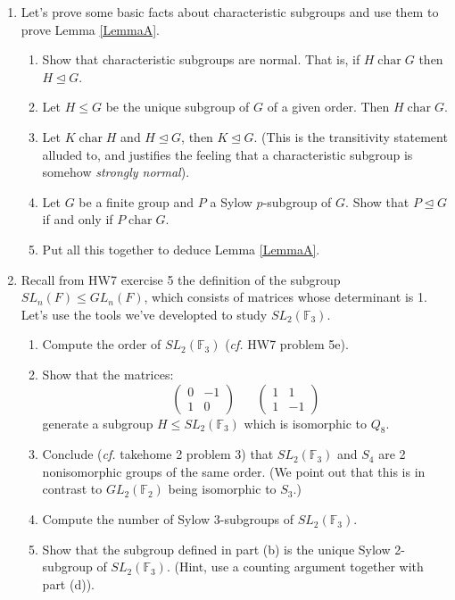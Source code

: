 \documentclass[11pt]{article}
\newcommand{\ch}{\operatorname{char}}
\newcommand{\bF}{\mathbb{F}}
\begin{document}
\begin{enumerate}
  \item{
  Let's prove some basic facts about characteristic subgroups and use them to prove Lemma \ref{LemmaA}.
  \begin{enumerate}
    \item{
    Show that characteristic subgroups are normal.  That is, if $H\ch G$ then $H\unlhd G$.
    }
    \item{
    Let $H\le G$ be the unique subgroup of $G$ of a given order.  Then $H\ch G$.
    }
    \item{
    Let $K\ch H$ and $H\unlhd G$, then $K\unlhd G$.  (This is the transitivity statement alluded to, and justifies the feeling that a characteristic subgroup is somehow \textit{strongly normal}).
    }
    \item{
    Let $G$ be a finite group and $P$ a Sylow $p$-subgroup of $G$.  Show that $P\unlhd G$ if and only if $P\ch G$.
    }
    \item{
    Put all this together to deduce Lemma \ref{LemmaA}.
    }
  \end{enumerate}
  }
  \item{
  Recall from HW7 exercise 5 the definition of the subgroup $SL_n(F)\le GL_n(F)$, which consists of matrices whose determinant is 1.  Let's use the tools we've developted to study $SL_2(\bF_3)$.
  \begin{enumerate}
    \item{
    Compute the order of $SL_2(\bF_3)$ (\textit{cf.} HW7 problem 5e).
    }
    \item{
    Show that the matrices:
    \[\begin{pmatrix}0 & -1\\1 & 0\end{pmatrix}\hspace{20pt}\begin{pmatrix}1&1\\1&-1\end{pmatrix}\]
    generate a subgroup $H\le SL_2(\bF_3)$ which is isomorphic to $Q_8$.
    }
    \item{
    Conclude (\textit{cf.} takehome 2 problem 3) that $SL_2(\bF_3)$ and $S_4$ are 2 nonisomorphic groups of the same order.  (We point out that this is in contrast to $GL_2(\bF_2)$ being isomorphic to $S_3$.)
    }
    \item{
    Compute the number of Sylow 3-subgroups of $SL_2(\bF_3)$.
    }
    \item{
    Show that the subgroup defined in part (b) is the unique Sylow 2-subgroup of $SL_2(\bF_3)$.  (Hint, use a counting argument together with part (d)).
}
\end{enumerate}}
\end{enumerate}
\end{document}
